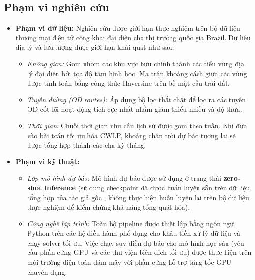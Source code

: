 \subsection{Phạm vi nghiên cứu}
\begin{itemize}
    \item \textbf{Phạm vi dữ liệu:} Nghiên cứu được giới hạn thực nghiệm trên bộ dữ liệu thương mại điện tử công khai đại diện cho thị trường quốc gia Brazil. Dữ liệu địa lý và lưu lượng được giới hạn khái quát như sau:
    \begin{itemize}
        \item \textit{Không gian:} Gom nhóm các khu vực bưu chính thành các tiểu vùng địa lý đại diện bởi tọa độ tâm hình học. Ma trận khoảng cách giữa các vùng được tính toán bằng công thức Haversine trên bề mặt cầu trái đất.
        \item \textit{Tuyến đường (OD routes):} Áp dụng bộ lọc thắt chặt để lọc ra các tuyến OD cốt lõi hoạt động tích cực nhất nhằm giảm thiểu nhiễu và độ thưa.
        \item \textit{Thời gian:} Chuỗi thời gian nhu cầu lịch sử được gom theo tuần. Khi đưa vào bài toán tối ưu hóa CWLP, khoảng chân trời dự báo tương lai sẽ được tổng hợp thành các chu kỳ tháng.
    \end{itemize}
    
    \item \textbf{Phạm vi kỹ thuật:}
    \begin{itemize}
        \item \textit{Lớp mô hình dự báo:} Mô hình dự báo được sử dụng ở trạng thái \textbf{zero-shot inference} (sử dụng checkpoint đã được huấn luyện sẵn trên dữ liệu tổng hợp của tác giả gốc \cite{bhethanabhotla2024}, không thực hiện huấn luyện lại trên bộ dữ liệu thực nghiệm để kiểm chứng khả năng tổng quát hóa).
        \item \textit{Công nghệ lập trình:} Toàn bộ pipeline được thiết lập bằng ngôn ngữ Python trên các hệ điều hành phổ dụng cho khâu tiền xử lý dữ liệu và chạy solver tối ưu. Việc chạy suy diễn dự báo cho mô hình học sâu (yêu cầu phần cứng GPU và các thư viện biên dịch tối ưu) được thực hiện trên môi trường điện toán đám mây với phần cứng hỗ trợ tăng tốc GPU chuyên dụng.
    \end{itemize}
\end{itemize}


